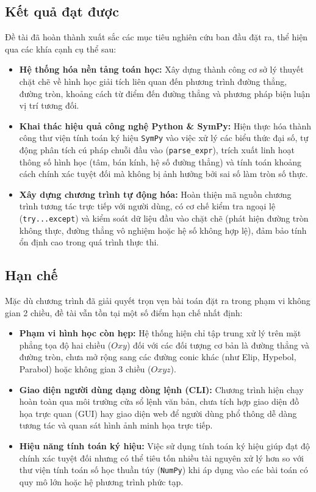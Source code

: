 \documentclass[12pt,a4paper]{article}
\begin{document}
\subsection{Kết quả đạt được}

Đề tài đã hoàn thành xuất sắc các mục tiêu nghiên cứu ban đầu đặt ra, thể hiện qua các khía cạnh cụ thể sau:

\begin{itemize}
    \item \textbf{Hệ thống hóa nền tảng toán học:} Xây dựng thành công cơ sở lý thuyết chặt chẽ về hình học giải tích liên quan đến phương trình đường thẳng, đường tròn, khoảng cách từ điểm đến đường thẳng và phương pháp biện luận vị trí tương đối.
    \item \textbf{Khai thác hiệu quả công nghệ Python \& SymPy:} Hiện thực hóa thành công thư viện tính toán ký hiệu \texttt{SymPy} vào việc xử lý các biểu thức đại số, tự động phân tích cú pháp chuỗi đầu vào (\texttt{parse\_expr}), trích xuất linh hoạt thông số hình học (tâm, bán kính, hệ số đường thẳng) và tính toán khoảng cách chính xác tuyệt đối mà không bị ảnh hưởng bởi sai số làm tròn số thực.
    \item \textbf{Xây dựng chương trình tự động hóa:} Hoàn thiện mã nguồn chương trình tương tác trực tiếp với người dùng, có cơ chế kiểm tra ngoại lệ (\texttt{try...except}) và kiểm soát dữ liệu đầu vào chặt chẽ (phát hiện đường tròn không thực, đường thẳng vô nghiệm hoặc hệ số không hợp lệ), đảm bảo tính ổn định cao trong quá trình thực thi.
\end{itemize}

\subsection{Hạn chế}

Mặc dù chương trình đã giải quyết trọn vẹn bài toán đặt ra trong phạm vi không gian 2 chiều, đề tài vẫn tồn tại một số điểm hạn chế nhất định:

\begin{itemize}
    \item \textbf{Phạm vi hình học còn hẹp:} Hệ thống hiện chỉ tập trung xử lý trên mặt phẳng tọa độ hai chiều ($Oxy$) đối với các đối tượng cơ bản là đường thẳng và đường tròn, chưa mở rộng sang các đường conic khác (như Elip, Hypebol, Parabol) hoặc không gian 3 chiều ($Oxyz$).
    \item \textbf{Giao diện người dùng dạng dòng lệnh (CLI):} Chương trình hiện chạy hoàn toàn qua môi trường cửa sổ lệnh văn bản, chưa tích hợp giao diện đồ họa trực quan (GUI) hay giao diện web để người dùng phổ thông dễ dàng tương tác và quan sát hình ảnh minh họa trực tiếp.
    \item \textbf{Hiệu năng tính toán ký hiệu:} Việc sử dụng tính toán ký hiệu giúp đạt độ chính xác tuyệt đối nhưng có thể tiêu tốn nhiều tài nguyên xử lý hơn so với thư viện tính toán số học thuần túy (\texttt{NumPy}) khi áp dụng vào các bài toán có quy mô lớn hoặc hệ phương trình phức tạp.
\end{itemize}
\end{document}
